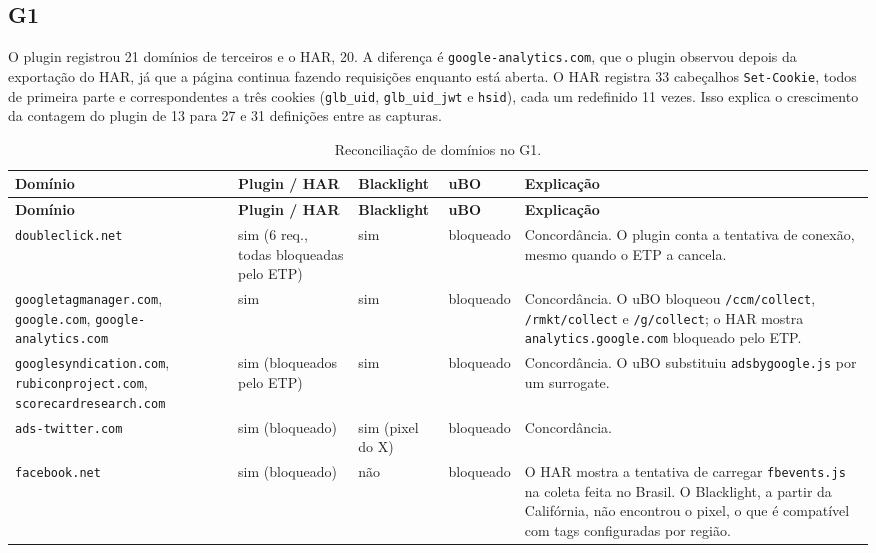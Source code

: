 \documentclass[11pt,a4paper]{article}
\begin{document}
\subsection{G1}

O plugin registrou 21 domínios de terceiros e o HAR, 20. A diferença é \texttt{google-analytics.\allowbreak{}com}, que o plugin observou depois da exportação do HAR, já que a página continua fazendo requisições enquanto está aberta. O HAR registra 33 cabeçalhos \texttt{Set-Cookie}, todos de primeira parte e correspondentes a três cookies (\texttt{glb\_uid}, \texttt{glb\_uid\_jwt} e \texttt{hsid}), cada um redefinido 11 vezes. Isso explica o crescimento da contagem do plugin de 13 para 27 e 31 definições entre as capturas.

\small
\begin{longtable}{|p{3.3cm}|p{1.9cm}|p{1.6cm}|p{1.6cm}|p{5.0cm}|}
\caption{Reconciliação de domínios no G1.}\\
\hline
\textbf{Domínio} & \textbf{Plugin / HAR} & \textbf{Blacklight} & \textbf{uBO} & \textbf{Explicação} \\ \hline
\endfirsthead
\hline
\textbf{Domínio} & \textbf{Plugin / HAR} & \textbf{Blacklight} & \textbf{uBO} & \textbf{Explicação} \\ \hline
\endhead
\texttt{doubleclick.\allowbreak{}net} & sim (6 req., todas bloqueadas pelo ETP) & sim & bloqueado & Concordância. O plugin conta a tentativa de conexão, mesmo quando o ETP a cancela. \\ \hline
\texttt{googletagmanager.\allowbreak{}com}, \texttt{google.\allowbreak{}com}, \texttt{google-analytics.\allowbreak{}com} & sim & sim & bloqueado & Concordância. O uBO bloqueou \texttt{/\allowbreak{}ccm/\allowbreak{}collect}, \texttt{/\allowbreak{}rmkt/\allowbreak{}collect} e \texttt{/\allowbreak{}g/\allowbreak{}collect}; o HAR mostra \texttt{analytics.\allowbreak{}google.\allowbreak{}com} bloqueado pelo ETP. \\ \hline
\texttt{googlesyndication.\allowbreak{}com}, \texttt{rubiconproject.\allowbreak{}com}, \texttt{scorecardresearch.\allowbreak{}com} & sim (bloqueados pelo ETP) & sim & bloqueado & Concordância. O uBO substituiu \texttt{adsbygoogle.\allowbreak{}js} por um surrogate. \\ \hline
\texttt{ads-twitter.\allowbreak{}com} & sim (bloqueado) & sim (pixel do X) & bloqueado & Concordância. \\ \hline
\texttt{facebook.\allowbreak{}net} & sim (bloqueado) & não & bloqueado & O HAR mostra a tentativa de carregar \texttt{fbevents.\allowbreak{}js} na coleta feita no Brasil. O Blacklight, a partir da Califórnia, não encontrou o pixel, o que é compatível com tags configuradas por região. \\ \hline

\end{longtable}
\end{document}
